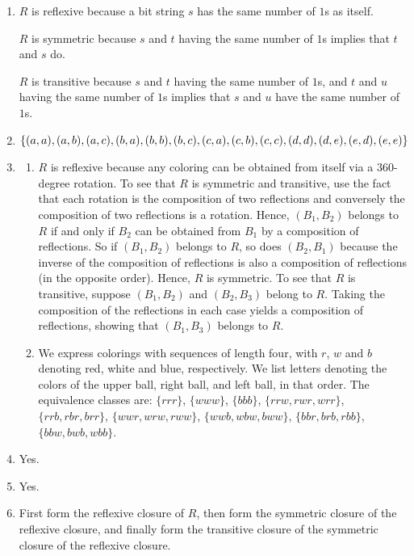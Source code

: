 \documentclass{sig-alternate-05-2015}
\begin{document}
\begin{enumerate}
\item $R$ is reflexive because a bit string $s$ has the same 
number of $1$s as itself. 

$R$ is symmetric because
$s$ and $t$ having the same number of $1$s implies that $t$ and $s$ do.

$R$ is transitive because $s$ and $t$ having the same number of $1$s,
and $t$ and $u$ having the same number of $1$s implies that $s$ and
$u$ have the same number of $1$s.

\item $\{(a, a), (a, b),
	(a, c), (b, a), (b, b), (b, c), (c, a),\\ (c, b), (c, c), (d, d), (d, e),
	(e, d), (e, e)\}$

\item 
\begin{enumerate}
	\item $R$ is
	reflexive because any coloring can be obtained from itself via
	a 360-degree rotation. To see that $R$ is symmetric and transitive,
	use the fact that each rotation is the composition of two reflections and conversely the composition of two reflections
	is a rotation. Hence, $(B_1, B_2)$ belongs to $R$ if and only
	if $B_2$ can be obtained from $B_1$ by a composition of reflections.
	So if $(B_1, B_2)$ belongs to $R$, so does $(B_2, B_1)$ because
	the inverse of the composition of reflections is also a composition
	of reflections (in the opposite order). Hence, $R$ is
	symmetric. To see that $R$ is transitive, suppose $(B_1, B_2)$ and
	$(B_2, B_3)$ belong to $R$. Taking the composition of the reflections
	in each case yields a composition of reflections, showing
	that $(B_1,B_3)$ belongs to $R$. 
	\item We express colorings with sequences
	of length four, with $r$, $w$ and $b$ denoting red, white and blue,
	respectively. We list letters denoting the colors of the upper
	ball, right ball, and left ball, in that order. The equivalence classes are: $\{rrr\}$, $\{www\}$, $\{bbb\}$, $\{rrw, rwr, wrr\}$, $\{rrb, rbr, brr\}$, $\{wwr, wrw, rww\}$, $\{wwb, wbw, bww\}$, $\{bbr, brb, rbb\}$, $\{bbw, bwb, wbb\}$.
\end{enumerate}

\item Yes.

\item Yes.

\item First form the reflexive closure of $R$, then form
the symmetric closure of the reflexive closure, and finally
form the transitive closure of the symmetric closure of the
reflexive closure.
\end{enumerate}
\end{document}

